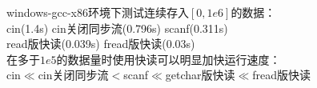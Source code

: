 windows-gcc-x86环境下测试连续存入$[0,1e6]$的数据：\\
cin(1.4s)\quad
cin关闭同步流(0.796s)\quad
scanf(0.311s)\quad\\
read版快读(0.039s)\quad
fread版快读(0.03s)\quad\\
在多于$1e5$的数据量时使用快读可以明显加快运行速度：\\
cin$\ll$cin关闭同步流$<$scanf$\ll$getchar版快读$\ll$fread版快读